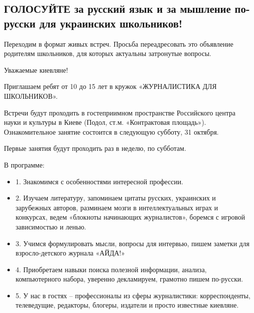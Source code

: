  
 
 

\subsection{ГОЛОСУЙТЕ за русский язык и за мышление по-русски для украинских школьников!}
\label{sec:24_10_2020.fb.roman_barashev.1.kruzhok}

Переходим в формат живых встреч. Просьба переадресовать это объявление
родителям школьников, для которых актуальны затронутые вопросы.

Уважаемые киевляне! 

Приглашаем ребят от 10 до 15 лет в кружок «ЖУРНАЛИСТИКА ДЛЯ ШКОЛЬНИКОВ».

Встречи будут проходить в гостеприимном пространстве Российского центра науки и
культуры в Киеве (Подол, ст.м. «Контрактовая площадь»). Ознакомительное занятие
состоится в следующую субботу, 31 октября. 

Первые занятия будут проходить раз в неделю, по субботам.

В программе:

\begin{itemize}
  \item 1. Знакомимся с особенностями интересной профессии. 
  \item 2. Изучаем литературу, запоминаем цитаты русских, украинских и зарубежных авторов, разминаем мозги в интеллектуальных играх и конкурсах, ведем «блокноты начинающих журналистов», боремся с игровой зависимостью и ленью. 
  \item 3. Учимся формулировать мысли, вопросы для интервью, пишем заметки для взросло-детского журнала «АЙДА!» 
  \item 4. Приобретаем навыки поиска полезной информации, анализа, компьютерного набора, уверенно декламируем, грамотно пишем по-русски.
  \item 5. У нас в гостях -- профессионалы из сферы журналистики: корреспонденты, телеведущие, редакторы, блогеры, издатели и просто известные киевляне.
\end{itemize}

